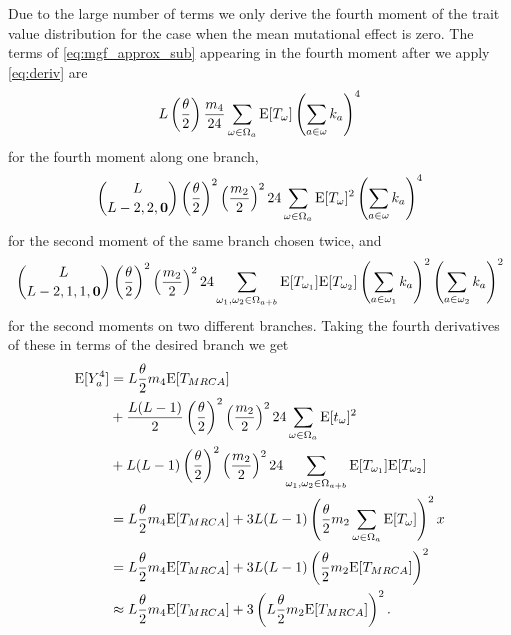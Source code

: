 Due to the large number of terms we only derive the fourth moment of the trait
value distribution for the case when the mean mutational effect is zero. The
terms of \eqref{eq:mgf_approx_sub} appearing in the fourth moment after we apply
\eqref{eq:deriv} are
\begin{equation*}
  L \left(\frac{\theta}{2}\right) \frac{m_4}{24}
  \sum_{\omega \in \Omega_a} \mathrm{E}[T_\omega] \left(\sum_{a \in \omega} k_a\right)^4
\end{equation*}
for the fourth moment along one branch,
\begin{equation*}
  \binom{L}{L-2,2,\mathbf{0}}\left(\frac{\theta}{2}\right)^2\left(\frac{m_2}{2}\right)^2
  24 \sum_{\omega \in \Omega_a} \mathrm{E}[T_\omega]^2 \left(\sum_{a \in \omega} k_a\right)^4
\end{equation*}
for the second moment of the same branch chosen twice, and
\begin{equation*}
  \binom{L}{L-2,1,1,\mathbf{0}}\left(\frac{\theta}{2}\right)^2\left(\frac{m_2}{2}\right)^2
  24 \sum_{\omega_1 , \omega_2 \in \Omega_{a+b}} \mathrm{E}[T_{\omega_1}]\mathrm{E}[T_{\omega_2}]
  \left(\sum_{a \in \omega_1} k_a\right)^2\left(\sum_{a \in \omega_2} k_a\right)^2
\end{equation*}
for the second moments on two different branches. Taking the fourth derivatives
of these in terms of the desired branch we get
\begin{align}
  \label{eq:mom4}
  \mathrm{E}[Y_a^4] &= L\frac{\theta}{2} m_4 \mathrm{E}[T_{MRCA}] \nonumber \\
  &+ \frac{L(L-1)}{2} \left(\frac{\theta}{2}\right)^2\left( \frac{m_2}{2} \right)^2
  24 \sum_{\omega \in \Omega_a} \mathrm{E}[t_\omega]^2 \nonumber \\
  &+ L(L-1) \left(\frac{\theta}{2}\right)^2\left( \frac{m_2}{2} \right)^2
  24 \sum_{\omega_1 , \omega_2 \in \Omega_{a+b}} \mathrm{E}[T_{\omega_1}]\mathrm{E}[T_{\omega_2}] \nonumber \\
  &= L\frac{\theta}{2} m_4 \mathrm{E}[T_{MRCA}] +
  3L(L-1)\left( \frac{\theta}{2} m_2 \sum_{\omega \in \Omega_a} \mathrm{E}[T_\omega] \right)^2x \nonumber \\
  &= L\frac{\theta}{2} m_4 \mathrm{E}[T_{MRCA}] +
  3L(L-1)\left( \frac{\theta}{2} m_2 \mathrm{E}[T_{MRCA}] \right)^2 \\
  &\approx L\frac{\theta}{2} m_4 \mathrm{E}[T_{MRCA}] +
  3\left(L \frac{\theta}{2} m_2 \mathrm{E}[T_{MRCA}] \right)^2. \nonumber 
\end{align}


